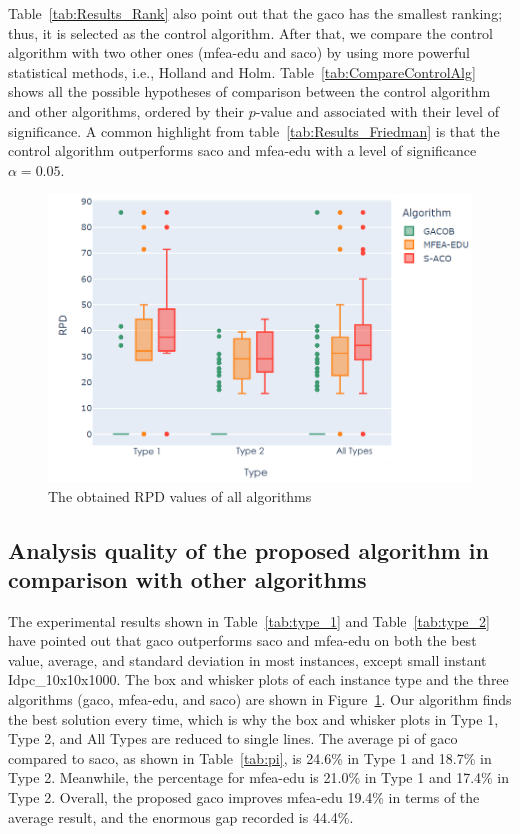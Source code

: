 Table~\ref{tab:Results_Rank} also point out that the \acrshort{gaco} has the smallest ranking; thus, it is selected as the control algorithm. After that, we compare the control algorithm with two other ones (\acrshort{mfea-edu} and \acrshort{saco}) by using more powerful statistical methods, i.e., Holland and Holm. Table~\ref{tab:CompareControlAlg} shows all the possible hypotheses of comparison between the control algorithm and other algorithms, ordered by their $p$-value and associated with their level of significance. A common highlight from table~\ref{tab:Results_Friedman} is that the control algorithm outperforms \acrshort{saco} and \acrshort{mfea-edu} with a level of significance $\alpha = 0.05$.

\renewcommand{\scalefigure}{0.5}
\begin{figure}[htbp]
	\centering
	\includegraphics[scale=\scalefigure]{Figures/chap 4/RPD_each_set.png}
	\caption{The obtained RPD values of all algorithms}
	\label{fig:rpd}
\end{figure}

\subsection{Analysis quality of the proposed algorithm in comparison with other algorithms}
The experimental results shown in Table~\ref{tab:type_1} and Table~\ref{tab:type_2} have pointed out that \acrshort{gaco} outperforms \acrshort{saco} and \acrshort{mfea-edu} on both the best value, average, and standard deviation in most instances, except small instant Idpc\_10x10x1000. The box and whisker plots of each instance type and the three algorithms (\acrshort{gaco}, \acrshort{mfea-edu}, and \acrshort{saco}) are shown in Figure~\ref{fig:rpd}. Our algorithm finds the best solution every time, which is why the box and whisker plots in Type 1, Type 2, and All Types are reduced to single lines. The average \gls{pi} of \acrshort{gaco} compared to \acrshort{saco}, as shown in Table~\ref{tab:pi}, is 24.6\% in Type 1 and  18.7\% in Type 2. Meanwhile, the percentage for \acrshort{mfea-edu} is 21.0\% in Type 1 and 17.4\% in Type 2. Overall, the proposed \acrshort{gaco} improves \acrshort{mfea-edu}  19.4\% in terms of the average result, and the enormous gap recorded is 44.4\%.

